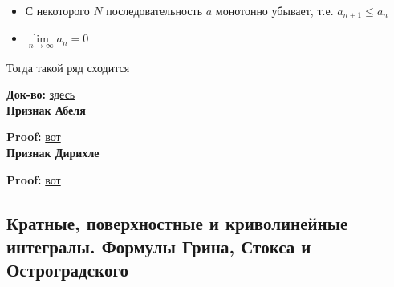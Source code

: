 \documentclass{article}
\begin{document}
\begin{itemize}
	\item С некоторого $N$ последовательность $a$ монотонно убывает, т.е. $a_{n+1} \le a_n$
	\item $\lim\limits_{n \rightarrow \infty}a_n = 0$
\end{itemize}

Тогда такой ряд сходится

{\bf Док-во:} \href{https://ru.wikipedia.org/wiki/%D0%A2%D0%B5%D0%BE%D1%80%D0%B5%D0%BC%D0%B0_%D0%9B%D0%B5%D0%B9%D0%B1%D0%BD%D0%B8%D1%86%D0%B0_%D0%BE_%D1%81%D1%85%D0%BE%D0%B4%D0%B8%D0%BC%D0%BE%D1%81%D1%82%D0%B8_%D0%B7%D0%BD%D0%B0%D0%BA%D0%BE%D1%87%D0%B5%D1%80%D0%B5%D0%B4%D1%83%D1%8E%D1%89%D0%B8%D1%85%D1%81%D1%8F_%D1%80%D1%8F%D0%B4%D0%BE%D0%B2}{здесь}\\
	
{\bf Признак Абеля}

{\bf Proof:} \href{https://ib.mazurok.com/2015/06/16/%D0%BF%D1%80%D0%B8%D0%B7%D0%BD%D0%B0%D0%BA%D0%B8-%D0%B0%D0%B1%D0%B5%D0%BB%D1%8F-%D0%B8-%D0%B4%D0%B8%D1%80%D0%B8%D1%85%D0%BB%D0%B5/}{вот}\\
	
{\bf Признак Дирихле}

	
{\bf Proof:} \href{https://ib.mazurok.com/2015/06/16/%D0%BF%D1%80%D0%B8%D0%B7%D0%BD%D0%B0%D0%BA%D0%B8-%D0%B0%D0%B1%D0%B5%D0%BB%D1%8F-%D0%B8-%D0%B4%D0%B8%D1%80%D0%B8%D1%85%D0%BB%D0%B5/}{вот}\\

\subsection{Кратные, поверхностные и криволинейные интегралы. Формулы Грина, Стокса и Остроградского}
\end{document}

